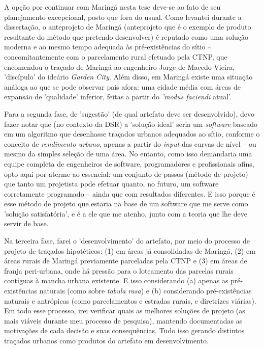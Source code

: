 \documentclass[]{report}
\begin{document}
    A opção por continuar com Maringá nesta tese deve-se ao fato de seu planejamento excepcional, posto que fora do usual. Como levantei durante a dissertação, o anteprojeto de Maringá (anteprojeto que é o exemplo de produto resultante do método que pretendo desenvolver) é reputado como uma solução moderna e ao mesmo tempo adequada às pré-existências do sítio – concomitantemente com o parcelamento rural efetuado pela CTNP, que encomendou o traçado de Maringá ao engenheiro Jorge de Macedo Vieira, 'discípulo' do ideário \textit{Garden City}. Além disso, em Maringá existe uma situação análoga ao que se pode observar país afora: uma cidade média com áreas de expansão de 'qualidade' inferior, feitas a partir do \textit{'modus faciendi} atual'.

    Para a segunda fase, de 'sugestão' (de qual artefato deve ser desenvolvido), devo fazer notar que (no contexto da DSR) a 'solução ideal' seria um \textit{software} baseado em um algoritmo que desenhasse traçados urbanos adequados ao sítio, conforme o conceito de \textit{rendimento urbano}, apenas a partir do \textit{input} das curvas de nível – ou mesmo da simples seleção de uma área. No entanto, como isso demandaria uma equipe completa de engenheiros de software, programadores e profissionais afins, opto aqui por aterme ao essencial: um conjunto de passos (método de projeto) que tanto um projetista pode efetuar quanto, no futuro, um software corretamente programado – ainda que com resultados diferentes. E isso porque é esse método de projeto que estaria na base de um software que me serve como 'solução satisfatória', e é a ele que me atenho, junto com a teoria que lhe deve servir de base.  

    Na terceira fase, farei o 'desenvolvimento' do artefato, por meio do processo de projeto de traçados hipotéticos: (1) em áreas já consolidadas de Maringá, (2) em áreas rurais de Maringá previamente parceladas pela CTNP e (3) em áreas de franja peri-urbana, onde  há pressão para o loteamento das parcelas rurais contíguas à mancha urbana existente. E isso considerando (a) apenas as pré-existências naturais (como sobre \textit{tabula rasa}) e (b) considerando pré-existências naturais e antrópicas (como parcelamentos e estradas rurais, e diretrizes viárias). Em todo esse processo, irei verificar quais as melhores soluções de projeto (as mais viáveis durante meu processo de pesquisa), mantendo documentadas as motivações de cada decisão e suas consequências. Tudo isso gerando distintos traçados urbanos como produtos do artefato em desenvolvimento.
\end{document}
